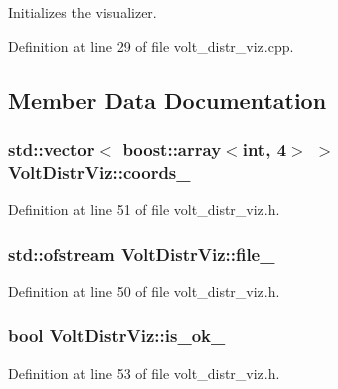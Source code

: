 \-Initializes the visualizer. 



\-Definition at line 29 of file volt\-\_\-distr\-\_\-viz.\-cpp.



\subsection{\-Member \-Data \-Documentation}
\subsubsection[{coords\-\_\-}]{\setlength{\rightskip}{0pt plus 5cm}std\-::vector$<$ boost\-::array$<$int, 4$>$ $>$ {\bf \-Volt\-Distr\-Viz\-::coords\-\_\-}\hspace{0.3cm}{\ttfamily  [private]}}\label{classVoltDistrViz_ac42afb95ab83e70d3d12afb1732954c9}


\-Definition at line 51 of file volt\-\_\-distr\-\_\-viz.\-h.

\subsubsection[{file\-\_\-}]{\setlength{\rightskip}{0pt plus 5cm}std\-::ofstream {\bf \-Volt\-Distr\-Viz\-::file\-\_\-}\hspace{0.3cm}{\ttfamily  [private]}}\label{classVoltDistrViz_a988bebf7069ec9ec78503572082d0a5a}


\-Definition at line 50 of file volt\-\_\-distr\-\_\-viz.\-h.

\subsubsection[{is\-\_\-ok\-\_\-}]{\setlength{\rightskip}{0pt plus 5cm}bool {\bf \-Volt\-Distr\-Viz\-::is\-\_\-ok\-\_\-}\hspace{0.3cm}{\ttfamily  [private]}}\label{classVoltDistrViz_aec9c99287d1edefe5177a957cefbbe86}


\-Definition at line 53 of file volt\-\_\-distr\-\_\-viz.\-h.

